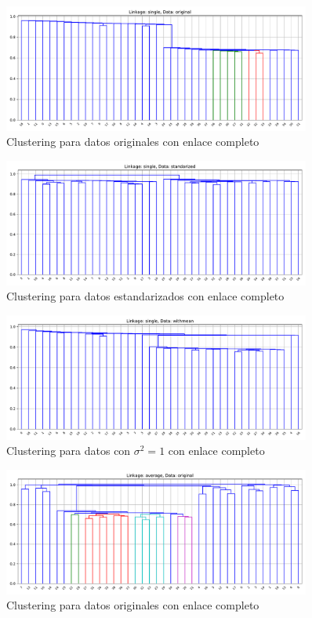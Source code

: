 \documentclass[11pt]{article}
\begin{document}
\begin{figure}[H]
    \centering
    \includegraphics[width = 0.90\textwidth]{4-singleoriginal.pdf}
    \caption{Clustering para datos originales con enlace completo}
    \label{4-singleoriginal}
\end{figure}
\begin{figure}[H]
    \centering
    \includegraphics[width = 0.90\textwidth]{4-singlestandarized.pdf}
    \caption{Clustering para datos estandarizados con enlace completo}
    \label{4-singlestandarized}
\end{figure}
\begin{figure}[H]
    \centering
    \includegraphics[width = 0.90\textwidth]{4-singlewithmean.pdf}
    \caption{Clustering para datos con $\sigma^2 = 1$ con enlace completo}
    \label{4-singlewithmean}
\end{figure}
\begin{figure}[H]
    \centering
    \includegraphics[width = 0.90\textwidth]{4-averageoriginal.pdf}
    \caption{Clustering para datos originales con enlace completo}
    \label{4-averageoriginal}
\end{figure}
\end{document}

